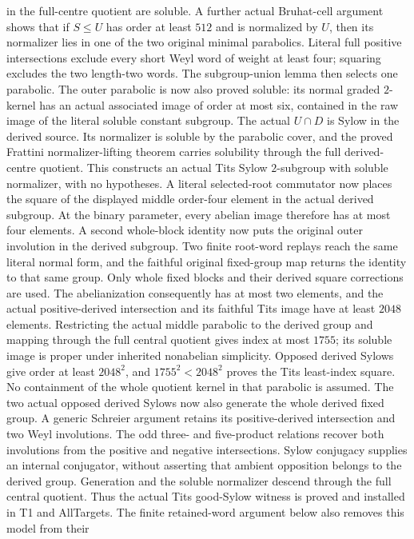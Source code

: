 in the full-centre quotient are soluble. A further actual Bruhat-cell
argument shows that if $S\leq U$ has order at least $512$ and is
normalized by $U$, then its normalizer lies in one of the two original
minimal parabolics. Literal full positive intersections exclude every
short Weyl word of weight at least four; squaring excludes the two
length-two words. The subgroup-union lemma then selects one parabolic.
The outer parabolic is now also proved soluble: its normal graded
$2$-kernel has an actual associated image of order at most six, contained
in the raw image of the literal soluble constant subgroup. The actual
$U\cap D$ is Sylow in the derived source. Its normalizer is soluble by
the parabolic cover, and the proved Frattini normalizer-lifting theorem
carries solubility through the full derived-centre quotient. This
constructs an actual Tits Sylow $2$-subgroup with soluble normalizer,
with no hypotheses. A literal selected-root commutator now places
the square of the displayed middle order-four element in the actual
derived subgroup. At the binary parameter, every abelian image
therefore has at most four elements. A second whole-block identity
now puts the original outer involution in the derived subgroup. Two
finite root-word replays reach the same literal normal form, and the
faithful original fixed-group map returns the identity to that same
group. Only whole fixed blocks and their derived square corrections
are used. The abelianization consequently has at most two elements,
and the actual positive-derived intersection and its faithful Tits
image have at least $2048$ elements. Restricting the actual middle
parabolic to the derived group and mapping through the full central
quotient gives index at most $1755$; its soluble image is proper under
inherited nonabelian simplicity. Opposed derived Sylows give order at
least $2048^2$, and $1755^2<2048^2$ proves the Tits least-index square.
No containment of the whole quotient kernel in that parabolic is
assumed. The two actual opposed derived Sylows now also generate the
whole derived fixed group. A generic Schreier argument retains its
positive-derived intersection and two Weyl involutions. The odd
three- and five-product relations recover both involutions from the
positive and negative intersections. Sylow conjugacy supplies an
internal conjugator, without asserting that ambient opposition belongs
to the derived group. Generation and the soluble normalizer descend
through the full central quotient. Thus the actual Tits good-Sylow
witness is proved and installed in T1 and AllTargets. The finite
retained-word argument below also removes this model from their
